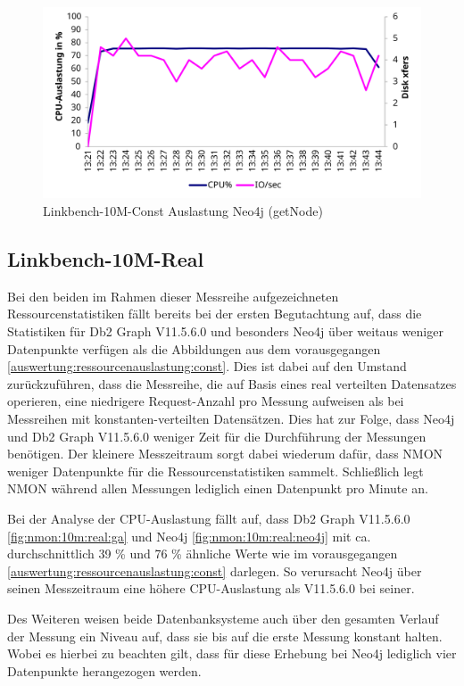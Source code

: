 \begin{figure}[!ht]
    \centering
    \includegraphics[width=\textwidth]{images/stats/linkbench-10m-const_neo4j.pdf}
    \caption{Linkbench-10M-Const Auslastung Neo4j (getNode)}
    \label{fig:nmon:10m:const:neo4j}
\end{figure}

\subsection{Linkbench-10M-Real}
\label{auswertung:ressourcenauslastung:real}
Bei den beiden im Rahmen dieser Messreihe aufgezeichneten Ressourcenstatistiken fällt bereits bei der ersten Begutachtung auf, dass die Statistiken für Db2 Graph V11.5.6.0 und besonders Neo4j über weitaus weniger Datenpunkte verfügen als die Abbildungen aus dem vorausgegangen \autoref{auswertung:ressourcenauslastung:const}. Dies ist dabei auf den Umstand zurückzuführen, dass die Messreihe, die auf Basis eines real verteilten Datensatzes operieren, eine niedrigere Request-Anzahl pro Messung aufweisen als bei Messreihen mit konstanten-verteilten Datensätzen. Dies hat zur Folge, dass Neo4j und Db2 Graph V11.5.6.0 weniger Zeit für die Durchführung der Messungen benötigen. Der kleinere Messzeitraum sorgt dabei wiederum dafür, dass NMON weniger Datenpunkte für die Ressourcenstatistiken sammelt. Schließlich legt NMON während allen Messungen lediglich einen Datenpunkt pro Minute an. 

Bei der Analyse der CPU-Auslastung fällt auf, dass Db2 Graph V11.5.6.0 \autoref{fig:nmon:10m:real:ga} und Neo4j \autoref{fig:nmon:10m:real:neo4j} mit ca. durchschnittlich 39 \% und 76 \% ähnliche Werte wie im vorausgegangen \autoref{auswertung:ressourcenauslastung:const} darlegen. So verursacht Neo4j über seinen Messzeitraum eine höhere CPU-Auslastung als V11.5.6.0 bei seiner.   

Des Weiteren weisen beide Datenbanksysteme auch über den gesamten Verlauf der Messung ein Niveau auf, dass sie bis auf die erste Messung konstant halten. Wobei es hierbei zu beachten gilt, dass für diese Erhebung bei Neo4j lediglich vier Datenpunkte herangezogen werden.

